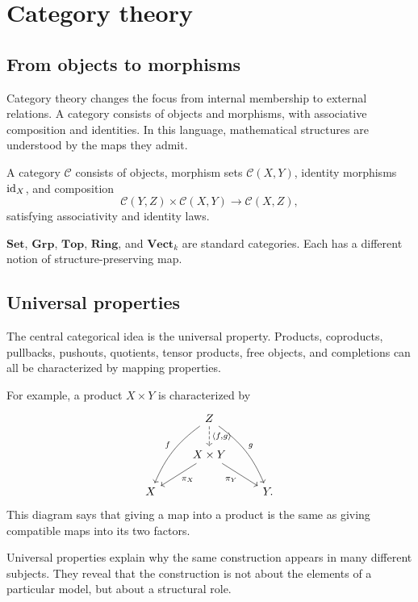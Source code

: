 \section{Category theory}

\subsection{From objects to morphisms}

Category theory changes the focus from internal membership to external relations.  A category consists of objects and morphisms, with associative composition and identities.  In this language, mathematical structures are understood by the maps they admit.

\begin{definition}
A category \(\mathcal C\) consists of objects, morphism sets \(\mathcal C(X,Y)\), identity morphisms \(\mathrm{id}_X\), and composition
\[
  \mathcal C(Y,Z)\times \mathcal C(X,Y)\to \mathcal C(X,Z),
\]
satisfying associativity and identity laws.
\end{definition}

\begin{example}
\(\mathbf{Set}\), \(\mathbf{Grp}\), \(\mathbf{Top}\), \(\mathbf{Ring}\), and \(\mathbf{Vect}_k\) are standard categories.  Each has a different notion of structure-preserving map.
\end{example}

\subsection{Universal properties}

The central categorical idea is the universal property.  Products, coproducts, pullbacks, pushouts, quotients, tensor products, free objects, and completions can all be characterized by mapping properties.

For example, a product \(X\times Y\) is characterized by
\[
\begin{tikzcd}
& Z \arrow[ddl,bend right=15,swap,"f"] \arrow[ddr,bend left=15,"g"] \arrow[d,dashed,"{\langle f,g\rangle}"] & \\
& X\times Y \arrow[dl,"\pi_X"] \arrow[dr,swap,"\pi_Y"] & \\
X && Y.
\end{tikzcd}
\]
This diagram says that giving a map into a product is the same as giving compatible maps into its two factors.

\begin{remark}
Universal properties explain why the same construction appears in many different subjects.  They reveal that the construction is not about the elements of a particular model, but about a structural role.
\end{remark}

